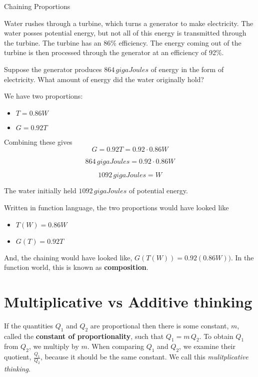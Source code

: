 \documentclass{ximera}
\begin{document}
\begin{example} Chaining Proportions

Water rushes through a turbine, which turns a generator to make electricity. The water posses potential energy, but not all of this energy is transmitted through the turbine.  The turbine has an 86\% efficiency. The energy coming out of the turbine is then processed through the generator at an efficiency of 92\%.

Suppose the generator produces $864 \, gigaJoules$ of energy in the form  of electricity.  What amount of energy did the water originally hold?


We have two proportions:

\begin{itemize}
\item $T = 0.86 W$
\item $G = 0.92 T$
\end{itemize} 

Combining these gives 
\[   G = 0.92 T = 0.92 \cdot 0.86 W   \]

\[   864 \, gigaJoules = 0.92 \cdot 0.86 W    \]


\[   1092 \, gigaJoules = W    \]



The water initially held $1092 \, gigaJoules$ of potential energy.

\end{example}


Written in function language, the two proportions would have looked like

\begin{itemize}
\item $T(W) = 0.86 W$
\item $G(T) = 0.92 T$
\end{itemize} 

And, the chaining would have looked like, $G(T(W)) = 0.92 (0.86 W))$.  In the function world, this is known as \textbf{composition}.






\section{Multiplicative vs Additive thinking}




If the quantities $Q_1$ and $Q_2$ are proportional then there is some constant, $m$, called the \textbf{constant of proportionality}, such that $Q_1 = m \, Q_2$.  To obtain $Q_1$ from $Q_2$, we multiply by $m$. When comparing $Q_1$ and $Q_2$, we examine their quotient, $\frac{Q_1}{Q_2}$, because it should be the same constant.  We call this \textit{mulitplicative thinking}.
\end{document}
